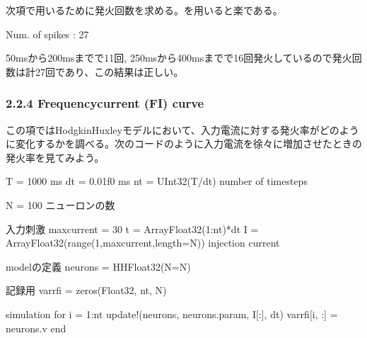 \documentclass[letterpaper,10pt,english]{sphinxmanual}
\begin{document}
次項で用いるために発火回数を求める。を用いると楽である。

\begin{sphinxVerbatim}[commandchars=\\\{\}]
  \PYG{p}{[} \PYG{p}{]}    \PYG{p}{[} \PYG{p}{]}  
   
 \PYG{p}{[}\PYG{p}{]}
\end{sphinxVerbatim}

\begin{sphinxVerbatim}[commandchars=\\\{\}]
Num. of spikes : 27
\end{sphinxVerbatim}

50msから200msまでで11回, 250msから400msまでで16回発火しているので発火回数は計27回であり、この結果は正しい。


\subsubsection{2.2.4 Frequency\sphinxhyphen{}current (F\sphinxhyphen{}I) curve}
\label{\detokenize{2-2_hodgkinhuxley:frequency-current-f-i-curve}}
この項ではHodgkin\sphinxhyphen{}Huxleyモデルにおいて、入力電流に対する発火率がどのように変化するかを調べる。次のコードのように入力電流を徐々に増加させたときの発火率を見てみよう。

\begin{sphinxVerbatim}[commandchars=\\\{\}]
T = 1000 \PYGZsh{} ms
dt = 0.01f0 \PYGZsh{} ms
nt = UInt32(T/dt) \PYGZsh{} number of timesteps

N = 100 \PYGZsh{} ニューロンの数

\PYGZsh{} 入力刺激
maxcurrent = 30
t = Array\PYGZob{}Float32\PYGZcb{}(1:nt)*dt
I = Array\PYGZob{}Float32\PYGZcb{}(range(1,maxcurrent,length=N)) \PYGZsh{} injection current

\PYGZsh{} modelの定義
neurons = HH\PYGZob{}Float32\PYGZcb{}(N=N)

\PYGZsh{} 記録用
varr\PYGZus{}fi = zeros(Float32, nt, N)

\PYGZsh{} simulation
for i = 1:nt
    update!(neurons, neurons.param, I[:], dt)
    varr\PYGZus{}fi[i, :] = neurons.v
end
\end{sphinxVerbatim}
\end{document}
